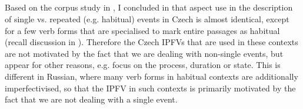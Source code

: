 \documentclass[output=paper,colorlinks,citecolor=brown]{langscibook}
\begin{document}
\subsection{\citet{gehrke22,gehrketrueipf}}
\label{sec:OFgehrke}

Based on the corpus study in \citet{gehrke02}, I concluded in \citet{gehrke22} that aspect use in the description of single vs. repeated (e.g. habitual) events in Czech is almost identical, except for a few verb forms that are specialised to mark entire passages as habitual (recall discussion in ). Therefore the Czech IPFVs that are used in these contexts are not motivated by the fact that we are dealing with non-single events, but appear for other reasons, e.g. focus on the process, duration or state. This is different in Russian, where many verb forms in habitual contexts are additionally imperfectivised, so that the IPFV in such contexts is primarily motivated by the fact that we are not dealing with a single event. 
\end{document}
